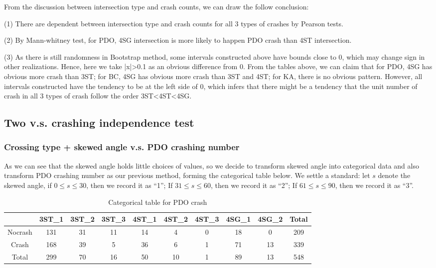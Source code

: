 \documentclass[11pt]{scrartcl} %
\begin{document}
From the discussion between intersection type and crash counts, we can draw the follow conclusion:

(1) There are dependent between intersection type and crash counts for all 3 types of crashes by Pearson tests.

(2) By Mann-whitney test, for PDO, 4SG intersection is more likely to happen PDO crash than 4ST intersection.

(3) As there is still randomness in Bootstrap method, some intervals constructed above have bounds close to 0, which may change sign in other realizations. Hence, here we take |x|>0.1 as an obvious difference from 0. From the tables above, we can claim that for PDO, 4SG has obvious more crash than 3ST; for BC, 4SG has obvious more crash than 3ST and 4ST; for KA, there is no obvious pattern. However, all intervals constructed have the tendency to be at the left side of 0, which infers that there might be a tendency that the unit number of crash in all 3 types of crash follow the order 3ST<4ST<4SG.

\subsection{Two v.s. crashing independence test}

\subsubsection{Crossing type + skewed angle v.s. PDO crashing number}

As we can see that the skewed angle holds little choices of values, so we decide to transform skewed angle into categorical data and also transform PDO crashing number as our previous method, forming the categorical table below. We settle a standard: let $s$ denote the skewed angle, if $0 \le s \le 30$, then we record it as ``1''; If $31 \le s \le 60$, then we record it as ``2''; If $61 \le s \le 90$, then we record it as ``3''.

\begin{table}[H]
\caption{Categorical table for PDO crash}
\centering
\begin{tabular}{|c|c|c|c|c|c|c|c|c|c|}
\hline
      & 3ST\_1 & 3ST\_2 & 3ST\_3 & 4ST\_1 & 4ST\_2 & 4ST\_3 & 4SG\_1 & 4SG\_2 & Total \\
\hline
Nocrash & 131 & 31  & 11 & 14 & 4 & 0 & 18 & 0 & 209\\
\hline
Crash    & 168  & 39  & 5  & 36 & 6 & 1 & 71 & 13 & 339\\
\hline
Total    & 299  & 70  & 16  & 50 & 10 & 1 & 89 & 13 & 548 \\
\hline
\end{tabular}
\end{table}
\end{document}
